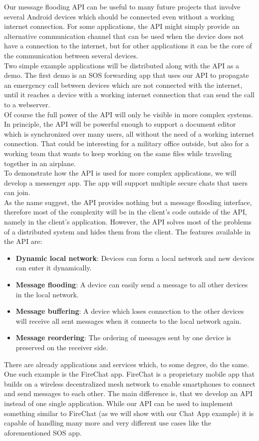 Our message flooding API can be useful to many future projects that involve several Android devices which should be connected even without a working internet connection. For some applications, the API might simply provide an alternative communication channel that can be used when the device does not have a connection to the internet, but for other applications it can be the core of the communication between several devices. \\
Two simple example applications will be distributed along with the API as a demo. The first demo is an SOS forwarding app that uses our API to propagate an emergency call between devices which are not connected with the internet, until it reaches a device with a working internet connection that can send the call to a webserver. \\
Of course the full power of the API will only be visible in more complex systems. In principle, the API will be powerful enough to support a document editor which is synchronized over many users, all without the need of a working internet connection. That could be interesting for a military office outside, but also for a working team that wants to keep working on the same files while traveling together in an airplane.\\
To demonstrate how the API is used for more complex applications, we will develop a messenger app. The app will support multiple secure chats that users can join. \\
As the name suggest, the API provides nothing but a message flooding interface, therefore most of the complexity will be in the client's code outside of the API, namely in the client's application. However, the API solves most of the problems of a distributed system and hides them from the client. The features available in the API are:
\begin{itemize}
	\item {\bf Dynamic local network}: Devices can form a local network and new devices can enter it dynamically.
	\item {\bf Message flooding}: A device can easily send a message to all other devices in the local network.
	\item {\bf Message buffering}: A device which loses connection to the other devices will receive all sent messages when it connects to the local network again.
	\item {\bf Message reordering}: The ordering of messages sent by one device is preserved on the receiver side.
\end{itemize}
There are already applications and services which, to some degree, do the same. One such example is the FireChat\cite{FireChat} app. FireChat is a proprietary mobile app that builds on a wireless decentralized mesh network to enable smartphones to connect and send messages to each other. The main difference is, that we develop an API instead of one single application. While our API can be used to implement something similar to FireChat (as we will show with our Chat App example) it is capable of handling many more and very different use cases like the aforementioned SOS app.
